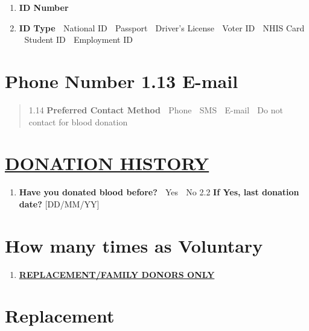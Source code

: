 \documentclass[]{article}
\begin{document}
\begin{enumerate}
\def\labelenumi{\arabic{enumi}.}
\setcounter{enumi}{9}
\item
  \textbf{ID Number}
\item
  \textbf{ID Type}  National ID  Passport  Driver's License  Voter
  ID  NHIS Card  Student ID  Employment ID
\end{enumerate}

\hypertarget{phone-number-1.13-e-mail}{%
\section{\texorpdfstring{Phone Number 1.13 E-mail
}{Phone Number 1.13 E-mail }}\label{phone-number-1.13-e-mail}}

\begin{quote}
1.14 \textbf{Preferred Contact Method}  Phone  SMS  E-mail  Do not
contact for blood donation
\end{quote}

\hypertarget{donation-history}{%
\section{\texorpdfstring{\ul{DONATION
HISTORY}}{DONATION HISTORY}}\label{donation-history}}

\begin{enumerate}
\def\labelenumi{\arabic{enumi}.}
\setcounter{enumi}{1}
\item
  \textbf{Have you donated blood before?}  Yes  No 2.2 \textbf{If Yes,
  last donation date?} {[}DD/MM/YY{]}
\end{enumerate}

\hypertarget{how-many-times-as-voluntary}{%
\section{\texorpdfstring{How many times as Voluntary
}{How many times as Voluntary }}\label{how-many-times-as-voluntary}}

\begin{enumerate}
\def\labelenumi{\arabic{enumi}.}
\item
  \textbf{\ul{REPLACEMENT/FAMILY DONORS ONLY}}
\end{enumerate}

\hypertarget{replacement}{%
\section*{\texorpdfstring{\hfill\break
Replacement }{ Replacement }}\label{replacement}}
\end{document}
